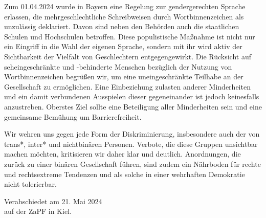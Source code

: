 \documentclass[DIV=calc]{scrartcl}
\begin{document}
Zum 01.04.2024 wurde in Bayern eine Regelung zur gendergerechten Sprache erlassen,
die mehrgeschlechtliche Schreibweisen durch Wortbinnenzeichen als unzulässig
deklariert. Davon sind neben den Behörden auch die staatlichen Schulen und
Hochschulen betroffen. Diese populistische Maßnahme ist nicht nur ein Eingriff in die
Wahl der eigenen Sprache, sondern mit ihr wird aktiv der Sichtbarkeit der Vielfalt
von Geschlechtern entgegengewirkt. Die Rücksicht auf seheingeschränkte und -behinderte Menschen bezüglich der Nutzung von Wortbinnenzeichen begrüßen wir, um eine
uneingeschränkte Teilhabe an der Gesellschaft zu ermöglichen. Eine Einbeziehung
zulasten anderer Minderheiten und ein damit verbundenen Ausspielen dieser
gegeneinander ist jedoch keinesfalls anzustreben. Oberstes Ziel sollte eine
Beteiligung aller Minderheiten sein und eine gemeinsame Bemühung um Barrierefreiheit.

Wir wehren uns gegen jede Form der Diskriminierung, insbesondere auch der von trans*,
inter* und nichtbinären Personen. Verbote, die diese Gruppen unsichtbar machen
möchten, kritisieren wir daher klar und deutlich. Anordnungen, die zurück zu einer
binären Gesellschaft führen, sind zudem ein Nährboden für rechte und rechtsextreme
Tendenzen und als solche in einer wehrhaften Demokratie nicht tolerierbar.


%
\vfill
\begin{flushright}
	Verabschiedet am 21. Mai 2024 \\
	auf der ZaPF in Kiel.
\end{flushright}
\end{document}
